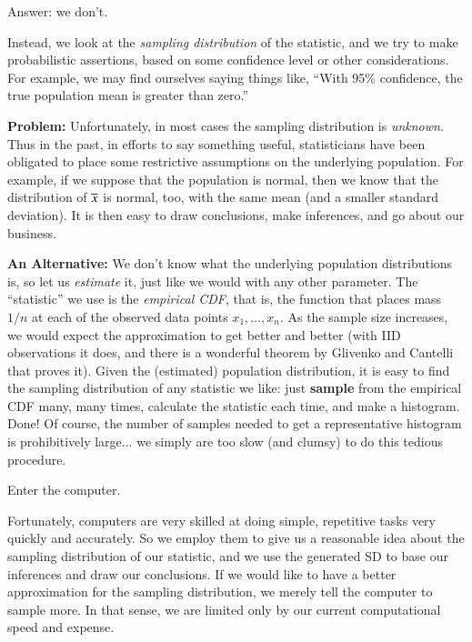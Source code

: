 \documentclass[captions=tableheading]{scrbook}
\begin{document}
\begin{center}
Answer: we don't. 
\end{center}

Instead, we look at the \emph{sampling distribution} of the statistic, and we try to make probabilistic assertions, based on some confidence level or other considerations. For example, we may find ourselves saying things like, ``With 95\% confidence, the true population mean is greater than zero.''

\textbf{Problem:} Unfortunately, in most cases the sampling distribution is \emph{unknown}. Thus in the past, in efforts to say something useful, statisticians have been obligated to place some restrictive assumptions on the underlying population. For example, if we suppose that the population is normal, then we know that the distribution of $\overline{x}$ is normal, too, with the same mean (and a smaller standard deviation). It is then easy to draw conclusions, make inferences, and go about our business.

\textbf{An Alternative:} We don't know what the underlying population distributions is, so let us \emph{estimate} it, just like we would with any other parameter. The ``statistic'' we use is the \emph{empirical CDF}, that is, the function that places mass $1/n$ at each of the observed data points $x_{1},\ldots,x_{n}$. As the sample size increases, we would expect the approximation to get better and better (with IID observations it does, and there is a wonderful theorem by Glivenko and Cantelli that proves it). Given the (estimated) population distribution, it is easy to find the sampling distribution of any statistic we like: just \textbf{sample} from the empirical CDF many, many times, calculate the statistic each time, and make a histogram. Done! Of course, the number of samples needed to get a representative histogram is prohibitively large$\ldots$ we simply are too slow (and clumsy) to do this tedious procedure.

\begin{center}
Enter the computer. 
\end{center}

Fortunately, computers are very skilled at doing simple, repetitive tasks very quickly and accurately. So we employ them to give us a reasonable idea about the sampling distribution of our statistic, and we use the generated SD to base our inferences and draw our conclusions. If we would like to have a better approximation for the sampling distribution, we merely tell the computer to sample more. In that sense, we are limited only by our current computational speed and expense.
\end{document}
